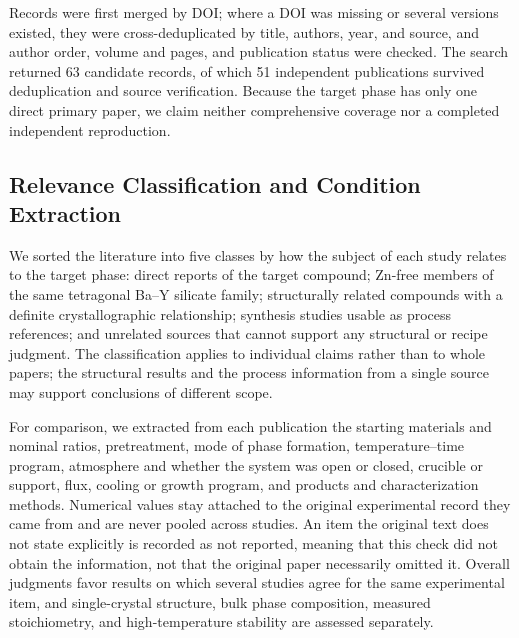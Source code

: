 Records were first merged by DOI; where a DOI was missing or several versions existed, they were cross-deduplicated by title, authors, year, and source, and author order, volume and pages, and publication status were checked. The search returned 63 candidate records, of which 51 independent publications survived deduplication and source verification. Because the target phase has only one direct primary paper, we claim neither comprehensive coverage nor a completed independent reproduction.

\subsection{Relevance Classification and Condition Extraction}

We sorted the literature into five classes by how the subject of each study relates to the target phase: direct reports of the target compound; Zn-free members of the same tetragonal Ba--Y silicate family; structurally related compounds with a definite crystallographic relationship; synthesis studies usable as process references; and unrelated sources that cannot support any structural or recipe judgment. The classification applies to individual claims rather than to whole papers; the structural results and the process information from a single source may support conclusions of different scope.

For comparison, we extracted from each publication the starting materials and nominal ratios, pretreatment, mode of phase formation, temperature--time program, atmosphere and whether the system was open or closed, crucible or support, flux, cooling or growth program, and products and characterization methods. Numerical values stay attached to the original experimental record they came from and are never pooled across studies. An item the original text does not state explicitly is recorded as not reported, meaning that this check did not obtain the information, not that the original paper necessarily omitted it. Overall judgments favor results on which several studies agree for the same experimental item, and single-crystal structure, bulk phase composition, measured stoichiometry, and high-temperature stability are assessed separately.
